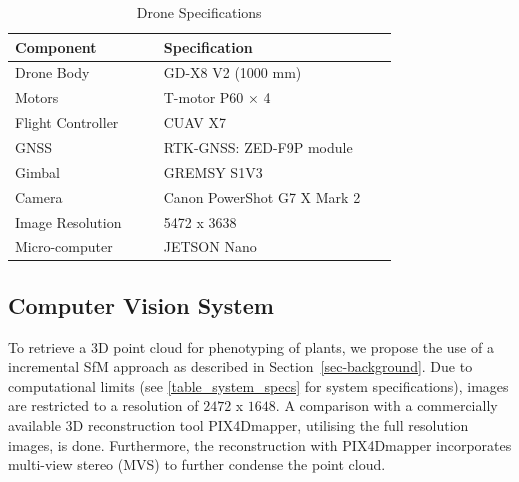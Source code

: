 \documentclass[conference,]{IEEEtran}
\begin{document}
\begin{table}
    \renewcommand{\arraystretch}{1.3}
    \caption{Drone Specifications \autocite{matsuura2023}}
    \label{table_specs}
    \centering
    \begin{tabular}{|>{\raggedright}p{0.35\linewidth}|p{0.55\linewidth}|}
        \hline
        \textbf{Component} & \textbf{Specification}\\
        \hline
        Drone Body & GD-X8 V2 (1000 mm)\\
        \hline
        Motors & T-motor P60 × 4 \\
        \hline
        Flight Controller & CUAV X7 \\
        \hline
        GNSS & RTK-GNSS: ZED-F9P module \\
        \hline
        Gimbal & GREMSY S1V3 \\
        \hline
        Camera & Canon PowerShot G7 X Mark 2 \\
        \hline
        Image Resolution & 5472 x 3638\\
        \hline
        Micro-computer & JETSON Nano \\
        \hline
    \end{tabular}
\end{table}

\hypertarget{computer-vision-system}{%
\subsection{Computer Vision System}\label{computer-vision-system}}

To retrieve a 3D point cloud for phenotyping of plants, we propose the
use of a incremental SfM approach as described in
Section~\ref{sec-background}. Due to computational limits (see
\cref{table_system_specs} for system specifications), images are
restricted to a resolution of \(2472\) x \(1648\). A comparison with a
commercially available 3D reconstruction tool PIX4Dmapper, utilising the
full resolution images, is done. Furthermore, the reconstruction with
PIX4Dmapper incorporates multi-view stereo (MVS) to further condense the
point cloud.
\end{document}

